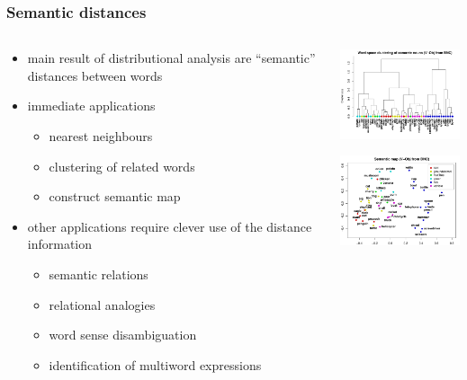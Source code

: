 \documentclass[t]{beamer} %
\begin{document}
\begin{frame}
  \frametitle{Semantic distances}

  \begin{columns}[T]
    \begin{column}{55mm}
      \begin{itemize}
      \item main result of distributional analysis are ``semantic'' distances between words
      \item immediate applications
        \begin{itemize}
        \item nearest neighbours
        \item clustering of related words
        \item construct semantic map
        \end{itemize}
      \item other applications require clever use of the distance information
        \begin{itemize}
        \item semantic relations
        \item relational analogies
        \item word sense disambiguation
        \item identification of multiword expressions
        \end{itemize}
      \end{itemize}
    \end{column}
    \begin{column}{55mm}
      \ungap[1]
      \includegraphics[width=50mm]{img/hieroglyph_clustering}

      \gap[1]
      \includegraphics[width=50mm]{img/hieroglyph_semantic_map}
    \end{column}
  \end{columns}
\end{frame}
\end{document}
